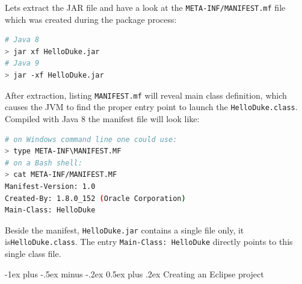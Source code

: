 \documentclass[10pt,landscape]{article}
\makeatletter
\renewcommand{\section}{\@startsection{section}{1}{0mm}%
                                {-1ex plus -.5ex minus -.2ex}%
                                {0.5ex plus .2ex}%
                                {\normalfont\large\bfseries}}
\makeatother
\begin{document}
\begin{multicols}{2}
\begin{lstlisting}[language=bash,frame=single]
\end{lstlisting}
Lets extract the JAR file and have a look at the \texttt{META-INF/MANIFEST.mf} file which was created during the package process:
\begin{lstlisting}[language=bash,frame=single]
# Java 8
> jar xf HelloDuke.jar
# Java 9
> jar -xf HelloDuke.jar
\end{lstlisting}
After extraction, listing \texttt{MANIFEST.mf} will reveal main class definition, which causes the JVM to find the proper entry point to launch the \texttt{HelloDuke.class}. Compiled with Java 8 the manifest file will look like:
\begin{lstlisting}[language=bash,frame=single]
# on Windows command line one could use:
> type META-INF\MANIFEST.MF
# on a Bash shell:
> cat META-INF/MANIFEST.MF
Manifest-Version: 1.0
Created-By: 1.8.0_152 (Oracle Corporation)
Main-Class: HelloDuke
\end{lstlisting}
Beside the manifest, \texttt{HelloDuke.jar} contains a single file only, it is\texttt{HelloDuke.class}. The entry \texttt{Main-Class: HelloDuke} directly points to this single class file.

\section{Creating an Eclipse project}

\end{multicols}
\end{document}
